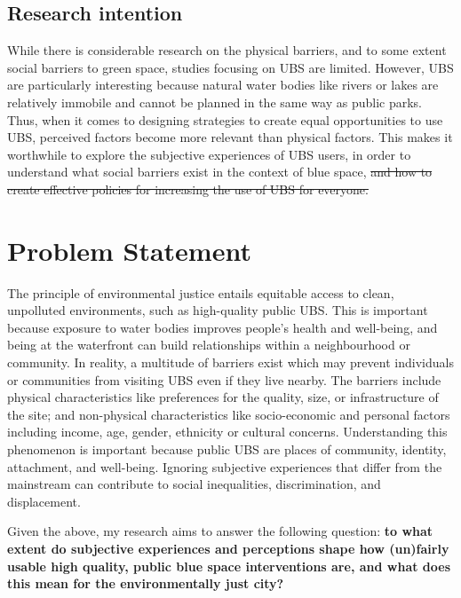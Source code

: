 \documentclass{article}
\begin{document}
\subsection{Research intention}

While there is considerable research on the physical barriers, and to some extent social barriers to green space, studies focusing on UBS are limited.
However, UBS are particularly interesting because natural water bodies like rivers or lakes are relatively immobile and cannot be planned in the same way as public parks.
Thus, when it comes to designing strategies to create equal opportunities to use UBS, perceived factors become more relevant than physical factors. 
This makes it worthwhile to explore the subjective experiences of UBS users, in order to understand what social barriers exist in the context of blue space, \sout{and how to create effective policies for increasing the use of UBS for everyone.}


\section{Problem Statement}

The principle of environmental justice entails equitable access to clean, unpolluted environments, such as high-quality public UBS. This is important because exposure to water bodies improves people's health and well-being, and being at the waterfront can build relationships within a neighbourhood or community.
In reality, a multitude of barriers exist which may prevent individuals or communities from visiting UBS even if they live nearby. The barriers include physical characteristics like preferences for the quality, size, or infrastructure of the site; and non-physical characteristics like socio-economic and personal factors including income, age, gender, ethnicity or cultural concerns.
Understanding this phenomenon is important because public UBS are places of community, identity, attachment, and well-being. Ignoring subjective experiences that differ from the mainstream can contribute to social inequalities, discrimination, and displacement.

Given the above, my research aims to answer the following question: \textbf{to what extent do subjective experiences and perceptions shape how (un)fairly usable high quality, public blue space interventions are, and what does this mean for the environmentally just city?}
\end{document}
